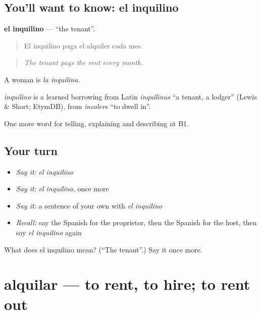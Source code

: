 \subsection*{You'll want to know: el inquilino}
\textbf{el inquilino} — \textquotedblleft{}the tenant\textquotedblright{}.

\begin{quote}
El inquilino paga el alquiler cada mes.
\end{quote}

\begin{quote}
\emph{The tenant pays the rent every month.}
\end{quote}

A woman is \emph{la inquilina}.

\begin{cousinweb}
\emph{inquilino} is a learned borrowing from Latin \emph{inquilīnus} \textquotedblleft{}a tenant, a lodger\textquotedblright{} (Lewis \& Short; EtymDB), from \emph{incolere} \textquotedblleft{}to dwell in\textquotedblright{}.
\end{cousinweb}

\begin{grammarlens}[title={What you've built}]
One more word for telling, explaining and describing at B1.
\end{grammarlens}

\subsection*{Your turn}
\begin{itemize}
\raggedright
  \item \emph{Say it:} \emph{el inquilino}
  \item \emph{Say it:} \emph{el inquilino}, once more
  \item \emph{Say it:} a sentence of your own with \emph{el inquilino}
  \item \emph{Recall:} say the Spanish for the proprietor, then the Spanish for the host, then say \emph{el inquilino} again
\end{itemize}

\begin{tcolorbox}[breakable,colback=teal!4,colframe=teal!35!black,title={Before you move on}]
What does el inquilino mean? (\textquotedblleft{}The tenant\textquotedblright{}.) Say it once more.
\end{tcolorbox}
\section[alquilar]{alquilar — to rent, to hire; to rent out}

